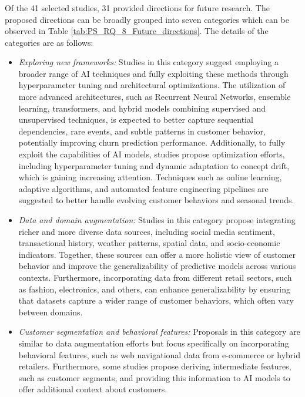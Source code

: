 \subsubsection{\RSRQeight}
\label{sec:RQ8}
Of the 41 selected studies, 31 provided directions for future research. The proposed directions can be broadly grouped into seven categories which can be observed in Table \ref{tab:PS_RQ_8_Future_directions}. The details of the categories are as follows:

\begin{itemize}

    \item \textit{Exploring new frameworks:} Studies in this category suggest employing a broader range of AI techniques and fully exploiting these methods through hyperparameter tuning and architectural optimizations. The utilization of more advanced architectures, such as Recurrent Neural Networks, ensemble learning, transformers, and hybrid models combining supervised and unsupervised techniques, is expected to better capture sequential dependencies, rare events, and subtle patterns in customer behavior, potentially improving churn prediction performance. Additionally, to fully exploit the capabilities of AI models, studies propose optimization efforts, including hyperparameter tuning and dynamic adaptation to concept drift, which is gaining increasing attention. Techniques such as online learning, adaptive algorithms, and automated feature engineering pipelines are suggested to better handle evolving customer behaviors and seasonal trends.


    \item \textit{Data and domain augmentation:} Studies in this category propose integrating richer and more diverse data sources, including social media sentiment, transactional history, weather patterns, spatial data, and socio-economic indicators. Together, these sources can offer a more holistic view of customer behavior and improve the generalizability of predictive models across various contexts. Furthermore, incorporating data from different retail sectors, such as fashion, electronics, and others, can enhance generalizability by ensuring that datasets capture a wider range of customer behaviors, which often vary between domains.
    
    \item \textit{Customer segmentation and behavioral features:} Proposals in this category are similar to data augmentation efforts but focus specifically on incorporating behavioral features, such as web navigational data from e-commerce or hybrid retailers. Furthermore, some studies propose deriving intermediate features, such as customer segments, and providing this information to AI models to offer additional context about customers.
    

\end{itemize}
